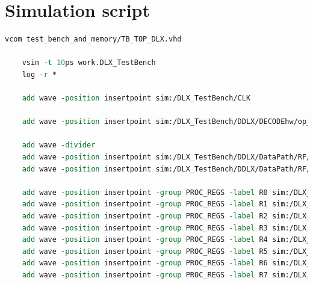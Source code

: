 \section{Simulation script}
\begin{lstlisting}[language=tcl,caption={Tcl script for staring the simulation and add the registers from R0 to R31},label=sim_wave]
	vcom test_bench_and_memory/TB_TOP_DLX.vhd
	
	vsim -t 10ps work.DLX_TestBench
	log -r *
	
	add wave -position insertpoint sim:/DLX_TestBench/CLK
	
	add wave -position insertpoint sim:/DLX_TestBench/DDLX/DECODEhw/op_code sim:/DLX_TestBench/DDLX/DECODEhw/ADD_RS1 sim:/DLX_TestBench/DDLX/DECODEhw/ADD_RS2 sim:/DLX_TestBench/DDLX/DECODEhw/ADD_WS1
	
	add wave -divider
	add wave -position insertpoint sim:/DLX_TestBench/DDLX/DataPath/RF/DATAIN
	add wave -position insertpoint sim:/DLX_TestBench/DDLX/DataPath/RF/ADD_WR
	
	add wave -position insertpoint -group PROC_REGS -label R0 sim:/DLX_TestBench/DDLX/DataPath/RF/REGS(0)/GLOB_BLK/BLOCK_GLOB/Q
	add wave -position insertpoint -group PROC_REGS -label R1 sim:/DLX_TestBench/DDLX/DataPath/RF/REGS(1)/GLOB_BLK/BLOCK_GLOB/Q
	add wave -position insertpoint -group PROC_REGS -label R2 sim:/DLX_TestBench/DDLX/DataPath/RF/REGS(2)/GLOB_BLK/BLOCK_GLOB/Q
	add wave -position insertpoint -group PROC_REGS -label R3 sim:/DLX_TestBench/DDLX/DataPath/RF/REGS(3)/GLOB_BLK/BLOCK_GLOB/Q
	add wave -position insertpoint -group PROC_REGS -label R4 sim:/DLX_TestBench/DDLX/DataPath/RF/REGS(4)/GLOB_BLK/BLOCK_GLOB/Q
	add wave -position insertpoint -group PROC_REGS -label R5 sim:/DLX_TestBench/DDLX/DataPath/RF/REGS(5)/GLOB_BLK/BLOCK_GLOB/Q
	add wave -position insertpoint -group PROC_REGS -label R6 sim:/DLX_TestBench/DDLX/DataPath/RF/REGS(6)/GLOB_BLK/BLOCK_GLOB/Q
	add wave -position insertpoint -group PROC_REGS -label R7 sim:/DLX_TestBench/DDLX/DataPath/RF/REGS(7)/GLOB_BLK/BLOCK_GLOB/Q
	

\end{lstlisting}
